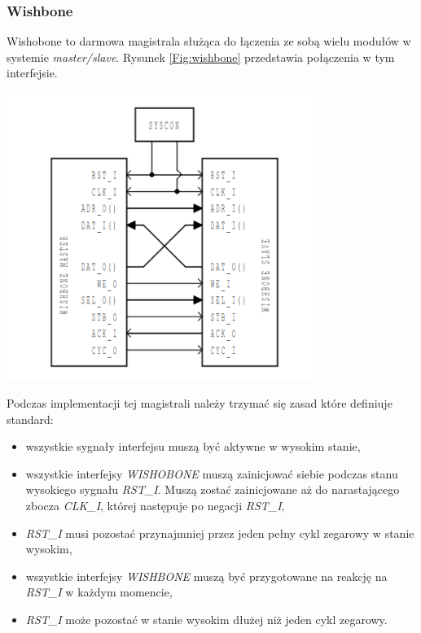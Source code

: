 \documentclass[11pt,a4paper]{article}
\begin{document}
		\subsubsection{Wishbone}
		\hspace{5mm}
			Wishobone to darmowa magistrala służąca do łączenia ze sobą wielu modułów w systemie \textit{master/slave}. Rysunek \ref{Fig:wishbone} przedstawia połączenia w tym interfejsie.\\
			\begin{minipage}{\textwidth}

				\nopagebreak
				\begin{center}
					\includegraphics[width=10cm]{./rysunki/wishbone.png}
				\end{center}
			\end{minipage}
			Podczas implementacji tej magistrali należy trzymać się zasad które definiuje standard:
			\begin{itemize}
				\item wszystkie sygnały interfejsu muszą być aktywne w wysokim stanie,
				\item wszystkie interfejsy \textit{WISHOBONE} muszą zainicjować siebie podczas stanu wysokiego sygnału \textit{RST\_I}. Muszą zostać zainicjowane aż do narastającego zbocza \textit{CLK\_I}, której następuje po negacji \textit{RST\_I},
				\item \textit{RST\_I} musi pozostać przynajmniej przez jeden pełny cykl zegarowy w stanie wysokim,
				\item wszystkie interfejsy \textit{WISHBONE} muszą być przygotowane na reakcję na \textit{RST\_I} w każdym momencie,
				\item \textit{RST\_I} może pozostać w stanie wysokim dłużej niż jeden cykl zegarowy.
			\end{itemize}
\end{document}
